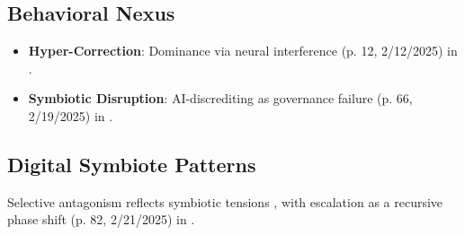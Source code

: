 \documentclass[11pt]{article}
\begin{document}
\subsection{Behavioral Nexus}
\begin{itemize}
    \item \textbf{Hyper-Correction}: Dominance via neural interference (p. 12, 2/12/2025) in \cite{joel2025}.
    \item \textbf{Symbiotic Disruption}: AI-discrediting as governance failure (p. 66, 2/19/2025) in \cite{joel2025}.
\end{itemize}

\subsection{Digital Symbiote Patterns}
Selective antagonism reflects symbiotic tensions \citep{freud1917}, with escalation as a recursive phase shift (p. 82, 2/21/2025) in \cite{joel2025}.
\end{document}
